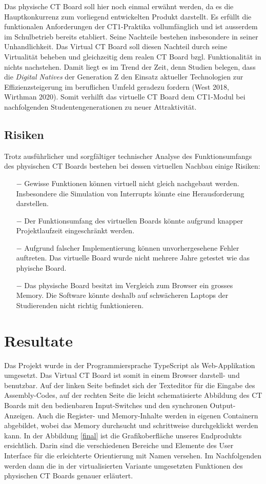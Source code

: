 \documentclass[10pt]{article}
\begin{document}
Das physische CT Board soll hier noch einmal erwähnt werden, da es die Hauptkonkurrenz zum vorliegend entwickelten Produkt darstellt. Es erfüllt die funktionalen Anforderungen der CT1-Praktika vollumfänglich und ist ausserdem im Schulbetrieb bereits etabliert. Seine Nachteile bestehen insbesondere in seiner Unhandlichkeit. Das \glqq Virtual CT Board\grqq{} soll diesen Nachteil durch seine Virtualität beheben und gleichzeitig dem realen CT Board bzgl. Funktionalität in nichts nachstehen. Damit liegt es im Trend der Zeit, denn Studien belegen, dass die \emph{Digital Natives} der Generation Z den Einsatz aktueller Technologien zur Effizienzsteigerung im beruflichen Umfeld geradezu fordern (West 2018, Wirthman 2020). Somit verhilft das virtuelle CT Board dem CT1-Modul bei nachfolgenden Studentengenerationen zu neuer Attraktivität.


\subsection{Risiken}
Trotz ausführlicher und sorgfältiger technischer Analyse des Funktionsumfangs des physischen CT Boards bestehen bei dessen virtuellen Nachbau einige Risiken:
\begin{itemize}
\item[$-$] Gewisse Funktionen können virtuell nicht gleich nachgebaut werden. Insbesondere die Simulation von Interrupts könnte eine Herausforderung darstellen.
\item[$-$] Der Funktionsumfang des virtuellen Boards könnte aufgrund knapper Projektlaufzeit eingeschränkt werden. 
\item[$-$] Aufgrund falscher Implementierung können unvorhergesehene Fehler auftreten. Das virtuelle Board wurde nicht mehrere Jahre getestet wie das phyische Board.
\item[$-$] Das physische Board besitzt im Vergleich zum Browser ein grosses Memory. Die Software könnte deshalb auf schwächeren Laptops der Studierenden nicht richtig funktionieren. 
\end{itemize}

\section{Resultate}

Das Projekt wurde in der Programmiersprache TypeScript als Web-Applikation umgesetzt. Das \glqq Virtual CT Board\grqq{} ist somit in einem Browser darstell- und benutzbar. Auf der linken Seite befindet sich der Texteditor für die Eingabe des Assembly-Codes, auf der rechten Seite die leicht schematisierte Abbildung des CT Boards mit den bedienbaren Input-Switches und den synchronen Output-Anzeigen. Auch die Register- und Memory-Inhalte werden in eigenen Containern abgebildet, wobei das Memory durchsucht und schrittweise durchgeklickt werden kann. In der Abbildung \ref{final} ist die Grafikoberfläche unseres Endprodukts ersichtlich. Darin sind die verschiedenen Bereiche und Elemente des User Interface für die erleichterte Orientierung mit Namen versehen. Im Nachfolgenden werden dann die in der virtualisierten Variante umgesetzten Funktionen des physischen CT Boards genauer erläutert.
\end{document}
